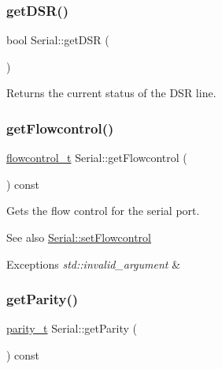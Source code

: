 \subsubsection{\texorpdfstring{get\+D\+S\+R()}{getDSR()}}
{\footnotesize\ttfamily bool Serial\+::get\+D\+SR (\begin{DoxyParamCaption}{ }\end{DoxyParamCaption})}

Returns the current status of the D\+SR line. \mbox{\label{classserial_1_1_serial_a81b78424cc1dda253ee07094eac60733}} 
\subsubsection{\texorpdfstring{get\+Flowcontrol()}{getFlowcontrol()}}
{\footnotesize\ttfamily \mbox{\hyperlink{namespaceserial_a93ef57a314b4e562f9eded6c15d34351}{flowcontrol\+\_\+t}} Serial\+::get\+Flowcontrol (\begin{DoxyParamCaption}{ }\end{DoxyParamCaption}) const}

Gets the flow control for the serial port.

\begin{DoxySeeAlso}{See also}
\mbox{\hyperlink{classserial_1_1_serial_ade41650d6bfe91b6432e5a0a60c03969}{Serial\+::set\+Flowcontrol}}
\end{DoxySeeAlso}

\begin{DoxyExceptions}{Exceptions}
{\em std\+::invalid\+\_\+argument} & \\
\hline
\end{DoxyExceptions}
\mbox{\label{classserial_1_1_serial_aba1b4a81903ab1b0b3ec5a49fd30b6e9}} 
\subsubsection{\texorpdfstring{get\+Parity()}{getParity()}}
{\footnotesize\ttfamily \mbox{\hyperlink{namespaceserial_a8f45d26bf7c9a06659e75b5004a50481}{parity\+\_\+t}} Serial\+::get\+Parity (\begin{DoxyParamCaption}{ }\end{DoxyParamCaption}) const}

